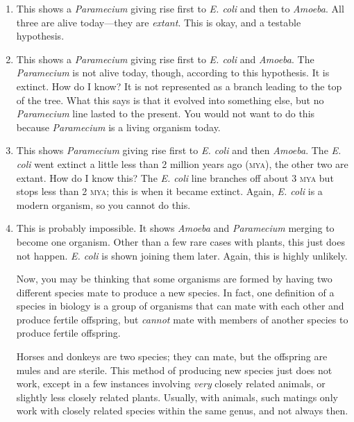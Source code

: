 \documentclass[12pt]{exam}
\begin{document}
\begin{enumerate}
\def\labelenumi{\alph{enumi}.}


\item
  This shows a \emph{Paramecium} giving rise first to \emph{E. coli} and
  then to \emph{Amoeba}. All three are alive today—they are
  \emph{extant}. This is okay, and a testable
  hypothesis.

\item
  This shows a \emph{Paramecium} giving rise first to \emph{E. coli} and
  \emph{Amoeba}. The \emph{Paramecium} is not alive today, though,
  according to this hypothesis. It is extinct. How do I know? It
  is not represented as a branch leading to the top of the tree. What
  this says is that it evolved into something else, but no
  \emph{Paramecium} line lasted to the present. You would not want to do
  this because \emph{Paramecium} is a living organism
  today.

\item
  This shows \emph{Paramecium} giving rise first to \emph{E. coli} and
  then \emph{Amoeba}. The \emph{E. coli} went extinct a little less
  than 2 million years ago (\textsc{mya}), the other two are extant. How do I
  know this? The \emph{E. coli} line branches off about 3 \textsc{mya} but
  stops less than 2 \textsc{mya}; this is when it became extinct.
  Again, \emph{E. coli} is a modern organism, so you cannot do
  this.

\item
  This is probably impossible. It shows \emph{Amoeba} and \textit{Paramecium}
  merging to become one organism. Other than a few rare cases with
  plants, this just does not happen. \emph{E. coli} is shown joining
  them later. Again, this is highly unlikely.
  
  Now, you may be  thinking that some organisms are formed by having two different
  species mate to produce a new species. In fact, one definition of a
  species in biology is a group of organisms that can mate with each
  other and produce fertile offspring, but \emph{cannot} mate with
  members of another species to produce fertile offspring.
  
  Horses and donkeys are two species; they
  can mate, but the offspring are mules and are sterile. This method
  of producing new species just does not work, except in a few instances
  involving \emph{very} closely related animals, or slightly less closely
  related plants. Usually, with animals, such matings only work with closely
  related species within the same genus, and not always then. 


\end{enumerate}
\end{document}
